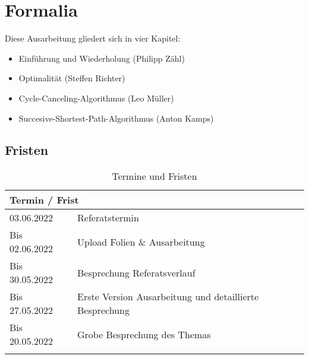 \chapter{Formalia}

Diese Ausarbeitung gliedert sich in vier Kapitel:
\begin{itemize}
    \item Einführung und Wiederholung (Philipp Zähl)
    \item Optimalität (Steffen Richter)
    \item Cycle-Canceling-Algorithmus (Leo Müller)
    \item Succesive-Shortest-Path-Algorithmus (Anton Kamps)
\end{itemize}

\section*{Fristen}

\begin{longtable}[c]{ll}
\multicolumn{2}{l}{\textbf{Termin / Frist}} \\ \hline
\endhead
%
03.06.2022 & Referatstermin \\
Bis 02.06.2022 & Upload Folien \& Ausarbeitung \\
Bis 30.05.2022 & Besprechung Referatsverlauf \\
Bis 27.05.2022 & Erste Version Ausarbeitung und detaillierte Besprechung \\
Bis 20.05.2022 & Grobe Besprechung des Themas \\
\caption{Termine und Fristen}
\label{tab:fristen}\\
\end{longtable}